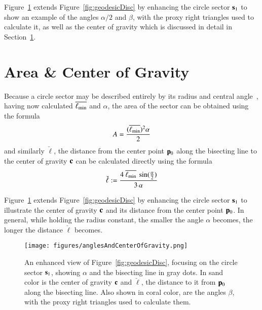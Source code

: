 Figure~\ref{fig:anglesAndCenterOfGravity} extends Figure~\ref{fig:geodesicDisc} by enhancing the circle sector $\mathbf{s}_1$ to show an example of the angles $\alpha/2$ and $\beta$, with the proxy right triangles used to calculate it, as well as the center of gravity which is discussed in detail in Section~\ref{ch4sIACG}.

%
%
%
%
\section{Area \& Center of Gravity}
\label{ch4sIACG}
Because a circle sector may be described entirely by its radius and central angle~\cite{Weisstein19d}, having now calculated $\overline{\ell_\text{min}}$ and $\alpha$, the area of the sector can be obtained using the formula
%
\begin{equation}
	A = \frac{(\overline{\ell_\text{min}})^2\alpha}{2}
	\label{eq:circularSectorArea}
\end{equation}
%
and similarly $\check{\ell}$, the distance from the center point $\mathbf{p}_0$ along the bisecting line to the center of gravity $\mathbf{c}$ can be calculated directly using the formula
%
\begin{equation}
	\check{\ell} := \frac{4\:\overline{\ell_\text{min}}\:\sin(\frac{\alpha}{2})}{3\,\alpha}
	\label{eq:distToCoG}
\end{equation}%

Figure~\ref{fig:anglesAndCenterOfGravity} extends Figure~\ref{fig:geodesicDisc} by enhancing the circle sector $\mathbf{s}_1$ to illustrate the center of gravity $\mathbf{c}$ and its distance from the center point $\mathbf{p}_0$. In general, while holding the radius constant, the smaller the angle $\alpha$ becomes, the longer the distance $\check{\ell}$ becomes.

\begin{figure}[ht]
\ffigbox
	{\texttt{[image: figures/anglesAndCenterOfGravity.png]}}
	{\caption[Angles and Center of Gravity]{An enhanced view of Figure~\ref{fig:geodesicDisc}, focusing on the circle sector $\mathbf{s}_1$, showing $\alpha$ and the bisecting line in gray dots. In sand color is the center of gravity $\mathbf{c}$ and $\check{\ell}$, the distance to it from $\mathbf{p}_0$ along the bisecting line. Also shown in coral color, are the angles $\beta$, with the proxy right triangles used to calculate them.}\label{fig:anglesAndCenterOfGravity}}
\end{figure}%

%
%
%
%
